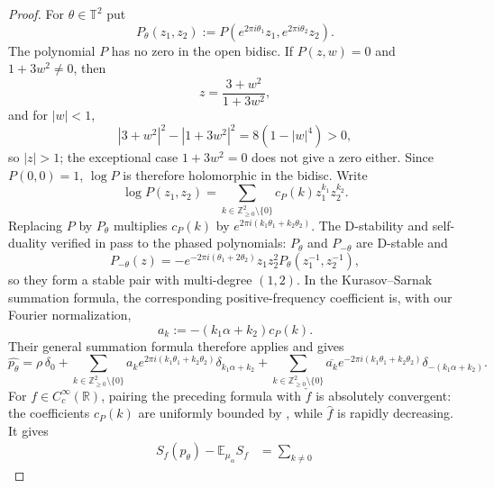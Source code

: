 \documentclass[11pt,reqno,a4paper]{amsart}
\numberwithin{equation}{section}
\theoremstyle{compact}
\theoremstyle{definition}
\theoremstyle{definition}
\begin{document}
\begin{proof}
For $\theta\in\mathbb T^2$ put
\begin{equation}\label{eq:ks-phased-polynomial}
  P_\theta(z_1,z_2)
  :=P(e^{2\pi i\theta_1}z_1,e^{2\pi i\theta_2}z_2).
\end{equation}
The polynomial $P$ has no zero in the open bidisc.  If $P(z,w)=0$ and
$1+3w^2\neq0$, then
\[
  z=\frac{3+w^2}{1+3w^2},
\]
and for $|w|<1$,
\begin{equation}\label{eq:ks-bidisc-zero-free}
  |3+w^2|^2-|1+3w^2|^2=8(1-|w|^4)>0,
\end{equation}
so $|z|>1$; the exceptional case $1+3w^2=0$ does not give a zero either.
Since $P(0,0)=1$, $\log P$ is therefore holomorphic in the bidisc.  Write
\begin{equation}\label{eq:ks-log-coefficients}
  \log P(z_1,z_2)
  =\sum_{k\in\mathbb Z_{\geq0}^2\setminus\{0\}}
     c_P(k)z_1^{k_1}z_2^{k_2}.
\end{equation}
Replacing $P$ by $P_\theta$ multiplies $c_P(k)$ by
$e^{2\pi i(k_1\theta_1+k_2\theta_2)}$.  The D-stability and self-duality
verified in \cite[Section~3]{KS20} pass to the phased polynomials: $P_\theta$
and $P_{-\theta}$ are D-stable and
\[
  P_{-\theta}(z)
  =-e^{-2\pi i(\theta_1+2\theta_2)}z_1z_2^2
    P_\theta(z_1^{-1},z_2^{-1}),
\]
so they form a stable pair with multi-degree $(1,2)$.  In the
Kurasov--Sarnak summation formula, the corresponding positive-frequency
coefficient is, with our Fourier normalization,
\begin{equation}\label{eq:ks-coefficient-link}
  a_k:=-(k_1\alpha+k_2)c_P(k).
\end{equation}
Their general summation formula \cite[Equation~(29) and Theorem~1]{KS20}
therefore applies and gives
\begin{equation}\label{eq:ks-deterministic-fourier-expansion}
  \widehat{p_\theta}
  =\rho\,\delta_0
   +\sum_{k\in\mathbb Z_{\geq0}^2\setminus\{0\}}
      a_k e^{2\pi i(k_1\theta_1+k_2\theta_2)}
      \delta_{k_1\alpha+k_2}
   +\sum_{k\in\mathbb Z_{\geq0}^2\setminus\{0\}}
      \overline{a_k}e^{-2\pi i(k_1\theta_1+k_2\theta_2)}
      \delta_{-(k_1\alpha+k_2)}.
\end{equation}
For $f\in C_c^\infty(\mathbb R)$, pairing the preceding formula with
$\check f$ is absolutely convergent: the coefficients $c_P(k)$ are uniformly
bounded by \cite[Equation~(35)]{KS20}, while $\widehat f$ is rapidly
decreasing.  It gives
\begin{align*}
 S_f(p_\theta)-\mathbb E_{\mu_\alpha}S_f
 &=\sum_{k\neq0}

\end{align*}
\end{proof}
\end{document}
